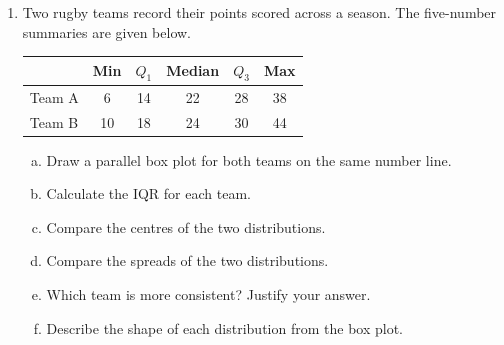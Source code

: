 \documentclass{article}
\begin{document}
\begin{enumerate}
  \item Two rugby teams record their points scored across a season. The five-number summaries
  are given below.
  \begin{center}
    \begin{tabular}{lccccc}
      \toprule
      & \textbf{Min} & $Q_1$ & \textbf{Median} & $Q_3$ & \textbf{Max} \\
      \midrule
      Team A & 6  & 14 & 22 & 28 & 38 \\
      Team B & 10 & 18 & 24 & 30 & 44 \\
      \bottomrule
    \end{tabular}
  \end{center}
  \begin{enumerate}[(a)]
    \item Draw a parallel box plot for both teams on the same number line.
    \item Calculate the IQR for each team.
    \item Compare the centres of the two distributions.
    \item Compare the spreads of the two distributions.
    \item Which team is more consistent? Justify your answer.
    \item Describe the shape of each distribution from the box plot.
  \end{enumerate}


\end{enumerate}
\end{document}
